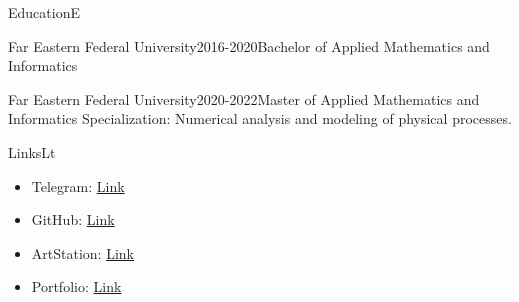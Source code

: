 \documentclass[10pt]{extarticle}
\begin{document}
	\setlength{\currentpos}{\getposy+5pt}
	
	\begin{centralpart}{Education}{E}{}
		\begin{titleblock}{Far Eastern Federal University}{2016-2020}{Bachelor of Applied Mathematics and Informatics}{}
		\end{titleblock}
		\begin{titleblock}{Far Eastern Federal University}{2020-2022}{Master of Applied Mathematics and Informatics}{}
			Specialization: Numerical analysis and modeling of physical processes.
		\end{titleblock}
	\end{centralpart}

	\setlength{\currentpos}{\getposy+5pt}
	\begin{centralpart}{Links}{L}{t}
		\begin{titleblock}{}{}{}{}
			\vspace*{-25pt}
			\begin{itemize}[label=$\circ$]
				\item Telegram: {\color{sidetopsep}\href{https://t.me/AriosJentu}{Link}} \vp
				\item GitHub: {\color{sidetopsep}\href{https://github.com/AriosJentu}{Link}} \vp
				\item ArtStation: {\color{sidetopsep}\href{https://AriosJentu.artstation.com/}{Link}} \vp
				\item Portfolio: {\color{sidetopsep}\href{https://drive.google.com/drive/folders/1hcmudyfBtrOo7_3qARUckmqdiUvxr0jT?usp=drive_link}{Link}} \vp
			\end{itemize}
		\end{titleblock}
	\end{centralpart}

	\setlength{\currentpos}{\getposy+20pt}

	\signature{S}
\end{document}
